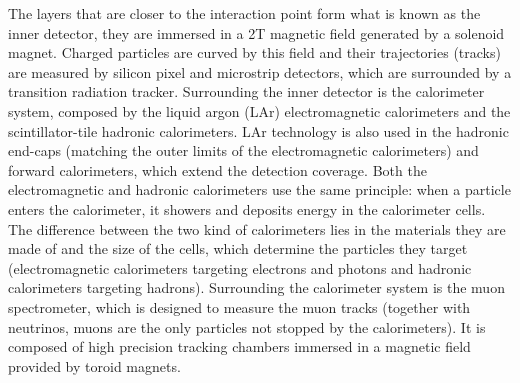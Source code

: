 \documentclass[main]{subfiles} %
\begin{document}
The layers \cite{Airapetian1999} that are closer to the interaction point form what is known as the inner detector, they are immersed in a 2\;T magnetic field generated by a solenoid magnet. Charged particles are curved by this field and their trajectories (tracks) are measured by silicon pixel and microstrip detectors, which are surrounded by a transition radiation tracker. Surrounding the inner detector is the calorimeter system, composed by the liquid argon (LAr) electromagnetic calorimeters and the scintillator-tile hadronic calorimeters. LAr technology is also used in the hadronic end-caps (matching the outer limits of the electromagnetic calorimeters) and forward calorimeters, which extend the detection coverage. Both the electromagnetic and hadronic calorimeters use the same principle: when a particle enters the calorimeter, it showers and deposits energy in the calorimeter cells. The difference between the two kind of calorimeters lies in the materials they are made of and the size of the cells, which determine the particles they target (electromagnetic calorimeters targeting electrons and photons and hadronic calorimeters targeting hadrons). Surrounding the calorimeter system is the muon spectrometer, which is designed to measure the muon tracks (together with neutrinos, muons are the only particles not stopped by the calorimeters). It is composed of high precision tracking chambers immersed in a magnetic field provided by toroid magnets.\\

\vspace{20pt}



















\biblio
\end{document}
